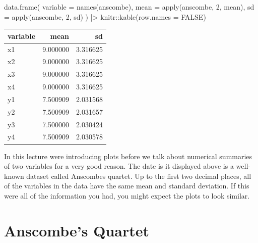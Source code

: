 \documentclass[
  letterpaper,
  DIV=11,
  numbers=noendperiod]{scrreprt}
\newenvironment{Shaded}{\begin{snugshade}}{\end{snugshade}}
\newcommand{\AttributeTok}[1]{\textcolor[rgb]{0.40,0.45,0.13}{#1}}
\newcommand{\ConstantTok}[1]{\textcolor[rgb]{0.56,0.35,0.01}{#1}}
\newcommand{\DecValTok}[1]{\textcolor[rgb]{0.68,0.00,0.00}{#1}}
\newcommand{\FunctionTok}[1]{\textcolor[rgb]{0.28,0.35,0.67}{#1}}
\newcommand{\NormalTok}[1]{\textcolor[rgb]{0.00,0.23,0.31}{#1}}
\newcommand{\SpecialCharTok}[1]{\textcolor[rgb]{0.37,0.37,0.37}{#1}}
\begin{document}
\begin{Shaded}
\begin{Highlighting}[]
\FunctionTok{data.frame}\NormalTok{(}
    \AttributeTok{variable =} \FunctionTok{names}\NormalTok{(anscombe),}
    \AttributeTok{mean =} \FunctionTok{apply}\NormalTok{(anscombe, }\DecValTok{2}\NormalTok{, mean),}
    \AttributeTok{sd =} \FunctionTok{apply}\NormalTok{(anscombe, }\DecValTok{2}\NormalTok{, sd)}
\NormalTok{) }\SpecialCharTok{|\textgreater{}}\NormalTok{ knitr}\SpecialCharTok{::}\FunctionTok{kable}\NormalTok{(}\AttributeTok{row.names =} \ConstantTok{FALSE}\NormalTok{)}
\end{Highlighting}
\end{Shaded}

\begin{longtable}[]{@{}lrr@{}}
\toprule\noalign{}
variable & mean & sd \\
\midrule\noalign{}
\endhead
\bottomrule\noalign{}
\endlastfoot
x1 & 9.000000 & 3.316625 \\
x2 & 9.000000 & 3.316625 \\
x3 & 9.000000 & 3.316625 \\
x4 & 9.000000 & 3.316625 \\
y1 & 7.500909 & 2.031568 \\
y2 & 7.500909 & 2.031657 \\
y3 & 7.500000 & 2.030424 \\
y4 & 7.500909 & 2.030578 \\
\end{longtable}

In this lecture were introducing plots before we talk about numerical
summaries of two variables for a very good reason. The date is it
displayed above is a well-known dataset called Anscombes quartet. Up to
the first two decimal places, all of the variables in the data have the
same mean and standard deviation. If this were all of the information
you had, you might expect the plots to look similar.

\hypertarget{anscombes-quartet}{%
\section{Anscombe's Quartet}\label{anscombes-quartet}}
\end{document}
